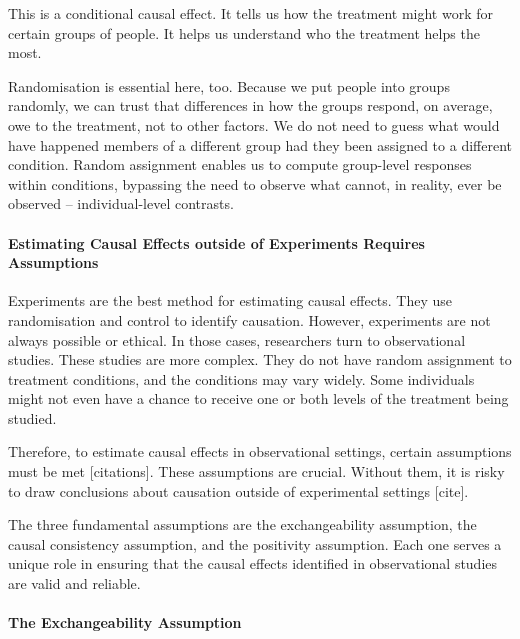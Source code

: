 \documentclass[
  singlecolumn]{article}
\let\oldparagraph\paragraph
\renewcommand{\paragraph}[1]{\oldparagraph{#1}\mbox{}}
\begin{document}
This is a conditional causal effect. It tells us how the treatment might
work for certain groups of people. It helps us understand who the
treatment helps the most.

Randomisation is essential here, too. Because we put people into groups
randomly, we can trust that differences in how the groups respond, on
average, owe to the treatment, not to other factors. We do not need to
guess what would have happened members of a different group had they
been assigned to a different condition. Random assignment enables us to
compute group-level responses within conditions, bypassing the need to
observe what cannot, in reality, ever be observed -- individual-level
contrasts.

\hypertarget{estimating-causal-effects-outside-of-experiments-requires-assumptions}{%
\paragraph{\texorpdfstring{\textbf{Estimating Causal Effects outside of
Experiments Requires
Assumptions}}{Estimating Causal Effects outside of Experiments Requires Assumptions}}\label{estimating-causal-effects-outside-of-experiments-requires-assumptions}}

Experiments are the best method for estimating causal effects. They use
randomisation and control to identify causation. However, experiments
are not always possible or ethical. In those cases, researchers turn to
observational studies. These studies are more complex. They do not have
random assignment to treatment conditions, and the conditions may vary
widely. Some individuals might not even have a chance to receive one or
both levels of the treatment being studied.

Therefore, to estimate causal effects in observational settings, certain
assumptions must be met {[}citations{]}. These assumptions are crucial.
Without them, it is risky to draw conclusions about causation outside of
experimental settings {[}cite{]}.

The three fundamental assumptions are the exchangeability assumption,
the causal consistency assumption, and the positivity assumption. Each
one serves a unique role in ensuring that the causal effects identified
in observational studies are valid and reliable.

\hypertarget{the-exchangeability-assumption}{%
\paragraph{\texorpdfstring{\textbf{The Exchangeability
Assumption}}{The Exchangeability Assumption}}\label{the-exchangeability-assumption}}
\end{document}
